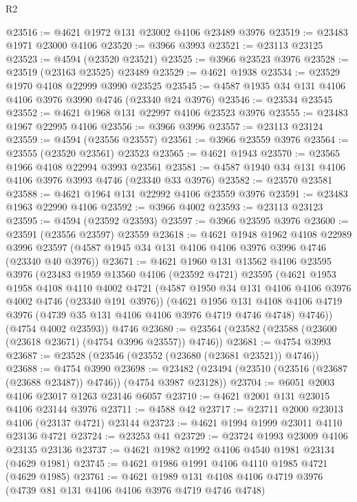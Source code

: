 \begin{lexlean}{R2}
\begin{coremodule}
@23516 := @4621 @1972 @131 @23002 @4106 @23489 @3976
@23519 := @23483 @1971 @23000 @4106
@23520 := @3966 @3993
@23521 := @23113 @23125
@23523 := @4594 (@23520 @23521)
@23525 := @3966 @23523 @3976
@23528 := @23519 (@23163 @23525) @23489
@23529 := @4621 @1938
@23534 := @23529 @1970 @4108 @22999 @3990 @23525
@23545 := @4587 @1935 @34 @131 @4106 @4106 @3976 @3990 @4746 (@23340 @24 @3976)
@23546 := @23534 @23545
@23552 := @4621 @1968 @131 @22997 @4106 @23523 @3976
@23555 := @23483 @1967 @22995 @4106
@23556 := @3966 @3996
@23557 := @23113 @23124
@23559 := @4594 (@23556 @23557)
@23561 := @3966 @23559 @3976
@23564 := @23555 (@23520 @23561) @23523
@23565 := @4621 @1943
@23570 := @23565 @1966 @4108 @22994 @3993 @23561
@23581 := @4587 @1940 @34 @131 @4106 @4106 @3976 @3993 @4746 (@23340 @33 @3976)
@23582 := @23570 @23581
@23588 := @4621 @1964 @131 @22992 @4106 @23559 @3976
@23591 := @23483 @1963 @22990 @4106
@23592 := @3966 @4002
@23593 := @23113 @23123
@23595 := @4594 (@23592 @23593)
@23597 := @3966 @23595 @3976
@23600 := @23591 (@23556 @23597) @23559
@23618 := @4621
    @1948
    @1962
    @4108
    @22989
    @3996
    @23597
    (@4587 @1945 @34 @131 @4106 @4106 @3976 @3996 @4746 (@23340 @40 @3976))
@23671 := @4621
    @1960
    @131
    @13562
    @4106
    @23595
    @3976
    (@23483
      @1959
      @13560
      @4106
      (@23592 @4721)
      @23595
      (@4621
        @1953
        @1958
        @4108
        @4110
        @4002
        @4721
        (@4587 @1950 @34 @131 @4106 @4106 @3976 @4002 @4746 (@23340 @191 @3976))
        (@4621
          @1956
          @131
          @4108
          @4106
          @4719
          @3976
          (@4739 @35 @131 @4106 @4106 @3976 @4719 @4746 @4748)
          @4746))
      (@4754 @4002 @23593))
    @4746
@23680 := @23564 (@23582 (@23588 (@23600 (@23618 @23671) (@4754 @3996 @23557)) @4746))
@23681 := @4754 @3993
@23687 := @23528 (@23546 (@23552 (@23680 (@23681 @23521)) @4746))
@23688 := @4754 @3990
@23698 := @23482 (@23494 (@23510 (@23516 (@23687 (@23688 @23487)) @4746)) (@4754 @3987 @23128))
@23704 := @6051 @2003 @4106 @23017 @1263 @23146 @6057
@23710 := @4621 @2001 @131 @23015 @4106 @23144 @3976
@23711 := @4588 @42
@23717 := @23711 @2000 @23013 @4106 (@23137 @4721) @23144
@23723 := @4621 @1994 @1999 @23011 @4110 @23136 @4721
@23724 := @23253 @41
@23729 := @23724 @1993 @23009 @4106 @23135 @23136
@23737 := @4621 @1982 @1992 @4106 @4540 @1981 @23134 (@4629 @1981)
@23745 := @4621 @1986 @1991 @4106 @4110 @1985 @4721 (@4629 @1985)
@23761 := @4621
    @1989
    @131
    @4108
    @4106
    @4719
    @3976
    (@4739 @81 @131 @4106 @4106 @3976 @4719 @4746 @4748)

\end{coremodule}
\end{lexlean}
